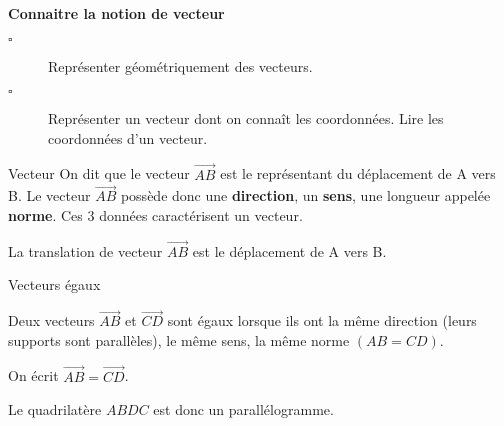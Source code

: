 \begin{titre}

\end{titre}

\begin{CpsCol}
\textbf{Connaitre la notion de vecteur}
\begin{description}
\item[$\square$] Représenter géométriquement des vecteurs.
\item[$\square$] Représenter un vecteur dont on connaît les coordonnées. Lire les coordonnées d’un
vecteur.
\end{description}
\end{CpsCol}



\begin{DefT}{Vecteur}
On dit que le vecteur $\overrightarrow{AB}$ est le représentant du déplacement de A vers B. Le vecteur $\overrightarrow{AB}$ possède donc une \textbf{direction}, un \textbf{sens}, une longueur appelée \textbf{norme}. 
Ces 3 données caractérisent un vecteur.

La translation de vecteur $\overrightarrow{AB}$ est le déplacement de A vers B.
\end{DefT}


 
 
\begin{ThT}{Vecteurs égaux}  
\begin{minipage}{0.48\linewidth}
Deux vecteurs $\overrightarrow{AB}$ et $\overrightarrow{CD}$ sont égaux lorsque ils ont la même direction (leurs supports sont parallèles), le même sens, la même norme $(AB=CD)$.

On écrit $\overrightarrow{AB}=\overrightarrow{CD}$. 

Le quadrilatère $ABDC$ est donc un parallélogramme.
\end{minipage}
\hfill
\begin{minipage}{0.48\linewidth}
\end{minipage}
\end{ThT}


